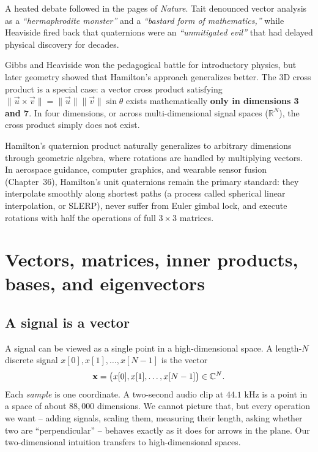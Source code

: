 \begin{historybox}
A heated debate followed in the pages of \emph{Nature}. Tait denounced vector analysis as a \emph{``hermaphrodite monster''} and a \emph{``bastard form of mathematics,''} while Heaviside fired back that quaternions were an \emph{``unmitigated evil''} that had delayed physical discovery for decades.

Gibbs and Heaviside won the pedagogical battle for introductory physics, but later geometry showed that Hamilton's approach generalizes better. The 3D cross product is a special case: a vector cross product satisfying $\|\vec{u}\times\vec{v}\| = \|\vec{u}\|\|\vec{v}\|\sin\theta$ exists mathematically \textbf{only in dimensions 3 and 7}. In four dimensions, or across multi-dimensional signal spaces ($\mathbb{R}^N$), the cross product simply does not exist.

Hamilton's quaternion product naturally generalizes to arbitrary dimensions through geometric algebra, where rotations are handled by multiplying vectors. In aerospace guidance, computer graphics, and wearable sensor fusion (Chapter~36), Hamilton's unit quaternions remain the primary standard: they interpolate smoothly along shortest paths (a process called spherical linear interpolation, or SLERP), never suffer from Euler gimbal lock, and execute rotations with half the operations of full $3\times 3$ matrices.
\end{historybox}

\section{Vectors, matrices, inner products, bases, and eigenvectors}
\label{ch42:linalg}

\subsection{A signal is a vector}

A signal can be viewed as a single point in a high-dimensional space. A length-$N$ discrete signal
$x[0], x[1], \dots, x[N-1]$ is the vector
\[
  \mathbf{x} = \big(x[0], x[1], \dots, x[N-1]\big) \in \mathbb{C}^N.
\]
Each \emph{sample} is one coordinate. A two-second audio clip at $44.1$ kHz is a point in a space
of about $88{,}000$ dimensions. We cannot picture that, but every operation we want -- adding
signals, scaling them, measuring their length, asking whether two are ``perpendicular'' --
behaves exactly as it does for arrows in the plane. Our two-dimensional intuition transfers to high-dimensional spaces.

